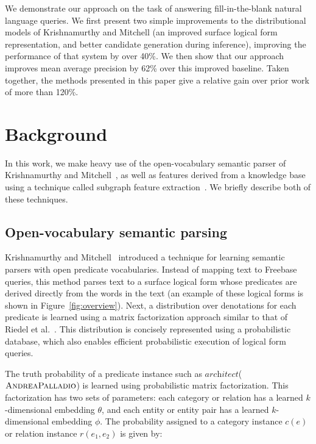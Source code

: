 \documentclass[11pt]{article}
\newcommand{\figref}[1]{Figure~\ref{fig:#1}}
\newcommand{\lexicalpredicate}[1]{\ensuremath{\textit{#1}}}
\newcommand{\entity}[1]{\ensuremath{\textsc{#1}}}
\begin{document}
We demonstrate our approach on the task of answering fill-in-the-blank natural
language queries.  We first present two simple improvements to the
distributional models of Krishnamurthy and Mitchell (an improved surface
logical form representation, and better candidate generation during inference),
improving the performance of that system by over 40\%.  We then show that our
approach improves mean average precision by 62\% over this improved baseline.
Taken together, the methods presented in this paper give a relative gain over
prior work of more than 120\%.

\section{Background}
\label{sec:background}

In this work, we make heavy use of the open-vocabulary semantic parser of
Krishnamurthy and
Mitchell~, as well as
features derived from a knowledge base using a technique called subgraph
feature extraction~\cite{gardner-2015-sfe}.  We briefly describe both of these
techniques.

\subsection{Open-vocabulary semantic parsing}
\label{sec:jayant-semparse}

Krishnamurthy and
Mitchell~ introduced a
technique for learning semantic parsers with open predicate vocabularies.
Instead of mapping text to Freebase queries, this method parses text to a
surface logical form whose predicates are derived directly from the words in
the text (an example of these logical forms is shown in \figref{overview}).
Next, a distribution over denotations for each predicate is learned using a
matrix factorization approach similar to that of Riedel et
al.~. This distribution is concisely
represented using a probabilistic database, which also enables efficient
probabilistic execution of logical form queries.

The truth probability of a predicate instance such as
\lexicalpredicate{architect}(\entity{AndreaPalladio}) is learned using
probabilistic matrix factorization. This factorization has two sets of
parameters: each category or relation has a learned $k$-dimensional embedding
$\theta$, and each entity or entity pair has a learned $k$-dimensional
embedding $\phi$. The probability assigned to a category instance $c(e)$ or
relation instance $r(e_1, e_2)$ is given by:
\end{document}
